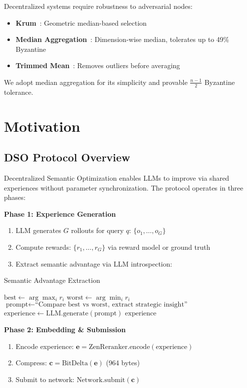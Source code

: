 \documentclass[11pt,a4paper]{article}
\begin{document}
Decentralized systems require robustness to adversarial nodes:

\begin{itemize}
\item \textbf{Krum}~\cite{blanchard2017krum}: Geometric median-based selection
\item \textbf{Median Aggregation}~\cite{yin2018median}: Dimension-wise median, tolerates up to 49\% Byzantine
\item \textbf{Trimmed Mean}~\cite{yin2018trimmed}: Removes outliers before averaging
\end{itemize}

We adopt median aggregation for its simplicity and provable $\frac{n-1}{2}$ Byzantine tolerance.

\section{Motivation}

\subsection{DSO Protocol Overview}

Decentralized Semantic Optimization enables LLMs to improve via shared experiences without parameter synchronization. The protocol operates in three phases:

\textbf{Phase 1: Experience Generation}
\begin{enumerate}
\item LLM generates $G$ rollouts for query $q$: $\{o_1, \ldots, o_G\}$
\item Compute rewards: $\{r_1, \ldots, r_G\}$ via reward model or ground truth
\item Extract semantic advantage via LLM introspection:
\end{enumerate}

\begin{algorithm}[H]
\caption{Semantic Advantage Extraction}
\begin{algorithmic}[1]
\STATE $\text{best} \gets \arg\max_i r_i$
\STATE $\text{worst} \gets \arg\min_i r_i$
\STATE $\text{prompt} \gets \text{``Compare best vs worst, extract strategic insight''}$
\STATE $\text{experience} \gets \text{LLM.generate}(\text{prompt})$
\RETURN $\text{experience}$
\end{algorithmic}
\end{algorithm}

\textbf{Phase 2: Embedding \& Submission}
\begin{enumerate}
\item Encode experience: $\mathbf{e} = \text{ZenReranker.encode}(\text{experience})$
\item Compress: $\mathbf{c} = \text{BitDelta}(\mathbf{e})$ (964 bytes)
\item Submit to network: $\text{Network.submit}(\mathbf{c})$
\end{enumerate}
\end{document}
